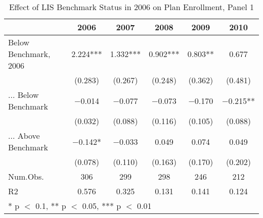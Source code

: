 \begin{table}
\centering
\begin{tabular}[t]{lccccc}
\toprule
  & 2006 & 2007 & 2008 & 2009 & 2010\\
\midrule
Below Benchmark, 2006 & \num{2.224}*** & \num{1.332}*** & \num{0.902}*** & \num{0.803}** & \num{0.677}\\
 & (\num{0.283}) & (\num{0.267}) & (\num{0.248}) & (\num{0.362}) & (\num{0.481})\\
... Below Benchmark & \num{-0.014} & \num{-0.077} & \num{-0.073} & \num{-0.170} & \num{-0.215}**\\
 & (\num{0.032}) & (\num{0.088}) & (\num{0.116}) & (\num{0.105}) & (\num{0.088})\\
... Above Benchmark & \num{-0.142}* & \num{-0.033} & \num{0.049} & \num{0.074} & \num{0.049}\\
 & (\num{0.078}) & (\num{0.110}) & (\num{0.163}) & (\num{0.170}) & (\num{0.202})\\
\midrule
Num.Obs. & \num{306} & \num{299} & \num{298} & \num{246} & \num{212}\\
R2 & \num{0.576} & \num{0.325} & \num{0.131} & \num{0.141} & \num{0.124}\\
\bottomrule
\multicolumn{6}{l}{\rule{0pt}{1em}* p $<$ 0.1, ** p $<$ 0.05, *** p $<$ 0.01}\\
\end{tabular}
\caption{Effect of LIS Benchmark Status in 2006 on Plan Enrollment, Panel 1}
\label{tab:panel1}
\end{table}
